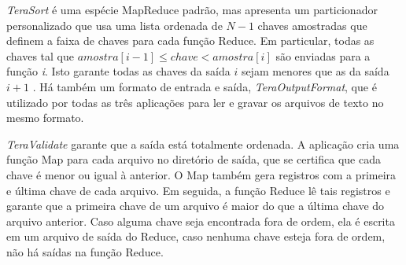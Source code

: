 \textit{TeraSort} é uma espécie MapReduce padrão, mas apresenta um particionador personalizado que usa uma lista ordenada de $ N-1 $ chaves amostradas que definem a faixa de chaves para cada função Reduce. 
Em particular, todas as chaves tal que $amostra [i-1] \le chave < amostra[i] $ são enviadas para a função \textit{i}. 
Isto garante todas as chaves da saída $i$ sejam menores que as da saída $i + 1$ .
Há também um formato de entrada e saída, \textit{TeraOutputFormat}, que é utilizado	 por todas as três aplicações  para ler e gravar os arquivos de texto no mesmo formato. 



\textit{TeraValidate} garante que a saída está totalmente ordenada. A aplicação cria uma função Map para cada arquivo no diretório de saída, que se certifica que cada chave é  menor ou igual à anterior. O Map também gera registros com a primeira e última chave de cada arquivo. Em seguida, a função Reduce lê tais registros e garante que a primeira chave de um arquivo é maior do que a última chave do arquivo anterior. Caso alguma chave seja encontrada fora de ordem, ela é escrita em um  arquivo de saída do Reduce, caso nenhuma chave esteja fora de ordem, não há saídas na função Reduce.


